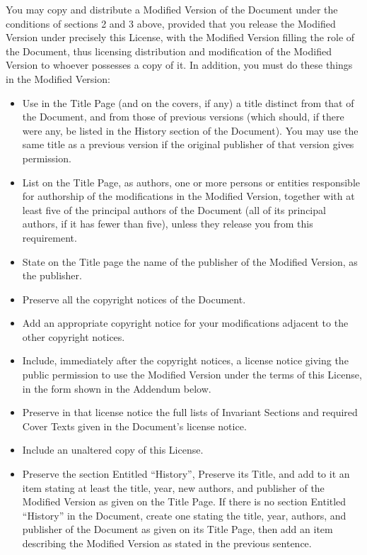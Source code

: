 \documentclass[a4paper,11pt,oneside]{book}
\begin{document}
You may copy and distribute a Modified Version of the Document under
the conditions of sections 2 and 3 above, provided that you release
the Modified Version under precisely this License, with the Modified
Version filling the role of the Document, thus licensing distribution
and modification of the Modified Version to whoever possesses a copy
of it.  In addition, you must do these things in the Modified Version:

\begin{itemize}
	\item[A.]
	Use in the Title Page (and on the covers, if any) a title distinct
	from that of the Document, and from those of previous versions
	(which should, if there were any, be listed in the History section
	of the Document).  You may use the same title as a previous version
	if the original publisher of that version gives permission.

	\item[B.]
	List on the Title Page, as authors, one or more persons or entities
	responsible for authorship of the modifications in the Modified
	Version, together with at least five of the principal authors of the
	Document (all of its principal authors, if it has fewer than five),
	unless they release you from this requirement.

	\item[C.]
	State on the Title page the name of the publisher of the
	Modified Version, as the publisher.

	\item[D.]
	Preserve all the copyright notices of the Document.

	\item[E.]
	Add an appropriate copyright notice for your modifications
	adjacent to the other copyright notices.

	\item[F.]
	Include, immediately after the copyright notices, a license notice
	giving the public permission to use the Modified Version under the
	terms of this License, in the form shown in the Addendum below.

	\item[G.]
	Preserve in that license notice the full lists of Invariant Sections
	and required Cover Texts given in the Document's license notice.

	\item[H.]
	Include an unaltered copy of this License.

	\item[I.]
	Preserve the section Entitled ``History'', Preserve its Title, and add
	to it an item stating at least the title, year, new authors, and
	publisher of the Modified Version as given on the Title Page.  If
	there is no section Entitled ``History'' in the Document, create one
	stating the title, year, authors, and publisher of the Document as
	given on its Title Page, then add an item describing the Modified
	Version as stated in the previous sentence.


\end{itemize}
\end{document}

